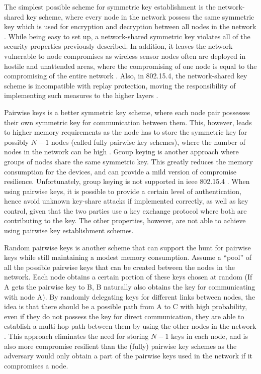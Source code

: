The simplest possible scheme for symmetric key establishment is the network-shared key scheme, where every node in the network possess the same symmetric key which is used for encryption and decryption between all nodes in the network \cite{perrig2004security}. While being easy to set up, a network-shared symmetric key violates all of the security properties previously described. In addition, it leaves the network vulnerable to node compromises as wireless sensor nodes often are deployed in hostile and unattended areas, where the compromising of one node is equal to the compromising of the entire network \cite{krentz20136lowpan}. Also, in 802.15.4, the network-shared key scheme is incompatible with replay protection, moving the responsibility of implementing such measures to the higher layers \cite{sastry2004security}.



Pairwise keys is a better symmetric key scheme, where each node pair possesses their own symmetric key for communication between them. This, however, leads to higher memory requirements as the node has to store the symmetric key for possibly $N-1$ nodes (called fully pairwise key schemes), where the number of nodes in the network can be high \cite{perrig2004security}. Group keying is another approach where groups of nodes share the same symmetric key. This greatly reduces the memory consumption for the devices, and can provide a mild version of compromise resilience. Unfortunately, group keying is not supported in \gls{ieee} 802.15.4 \cite{sastry2004security}. When using pairwise keys, it is possible to provide a certain level of authentication, hence avoid unknown key-share attacks if implemented correctly, as well as key control, given that the two parties use a key exchange protocol where both are contributing to the key. The other properties, however, are not able to achieve using pairwise key establishment schemes. 

Random pairwise keys is another scheme that can support the hunt for pairwise keys while still maintaining a modest memory consumption. Assume a ``pool'' of all the possible pairwise keys that can be created between the nodes in the network. Each node obtains a certain portion of these keys chosen at random (If A gets the pairwise key to B, B naturally also obtains the key for communicating with node A). By randomly delegating keys for different links between nodes, the idea is that there should be a possible path from A to C with high probability, even if they do not possess the key for direct communication, they are able to establish a multi-hop path between them by using the other nodes in the network \cite{liu2005establishing}. This approach eliminates the need for storing $N-1$ keys in each node, and is also more compromise resilient than the (fully) pairwise key schemes as the adversary would only obtain a part of the pairwise keys used in the network if it compromises a node. 


